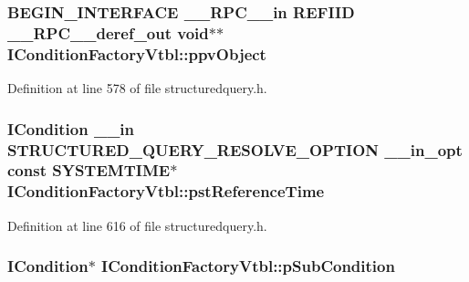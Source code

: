 \subsubsection[{\texorpdfstring{ppv\+Object}{ppvObject}}]{\setlength{\rightskip}{0pt plus 5cm}B\+E\+G\+I\+N\+\_\+\+I\+N\+T\+E\+R\+F\+A\+CE {\bf \+\_\+\+\_\+\+R\+P\+C\+\_\+\+\_\+in} {\bf R\+E\+F\+I\+ID} {\bf \+\_\+\+\_\+\+R\+P\+C\+\_\+\+\_\+deref\+\_\+out} {\bf void}$\ast$$\ast$ I\+Condition\+Factory\+Vtbl\+::ppv\+Object}\hypertarget{struct_i_condition_factory_vtbl_aad57780a80b1734b4bf7172636a94e1c}{}\label{struct_i_condition_factory_vtbl_aad57780a80b1734b4bf7172636a94e1c}


Definition at line 578 of file structuredquery.\+h.

\subsubsection[{\texorpdfstring{pst\+Reference\+Time}{pstReferenceTime}}]{ {\bf I\+Condition} {\bf \+\_\+\+\_\+in} {\bf S\+T\+R\+U\+C\+T\+U\+R\+E\+D\+\_\+\+Q\+U\+E\+R\+Y\+\_\+\+R\+E\+S\+O\+L\+V\+E\+\_\+\+O\+P\+T\+I\+ON} {\bf \+\_\+\+\_\+in\+\_\+opt} {\bf const} S\+Y\+S\+T\+E\+M\+T\+I\+ME$\ast$ I\+Condition\+Factory\+Vtbl\+::pst\+Reference\+Time}\hypertarget{struct_i_condition_factory_vtbl_abad3f9075516b0c25d5b147689de4574}{}\label{struct_i_condition_factory_vtbl_abad3f9075516b0c25d5b147689de4574}


Definition at line 616 of file structuredquery.\+h.

\subsubsection[{\texorpdfstring{p\+Sub\+Condition}{pSubCondition}}]{ {\bf I\+Condition}$\ast$ I\+Condition\+Factory\+Vtbl\+::p\+Sub\+Condition}\hypertarget{struct_i_condition_factory_vtbl_a913c1c3e188201729e5f7623c7074c04}{}\label{struct_i_condition_factory_vtbl_a913c1c3e188201729e5f7623c7074c04}


